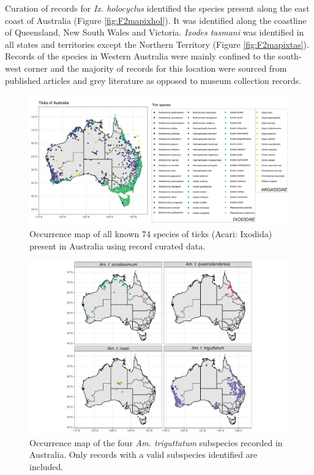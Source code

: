 \documentclass[a4paper, nobind]{templates/ociamthesis}
\begin{document}
Curation of records for \emph{Ix. holocyclus} identified the species present along the east coast of Australia (Figure \ref{fig:F2mapixhol}).
It was identified along the coastline of Queensland, New South Wales and Victoria.
\emph{Ixodes tasmani} was identified in all states and territories except the Northern Territory (Figure \ref{fig:F2mapixtas}).
Records of the species in Western Australia were mainly confined to the south-west corner and the majority of records for this location were sourced from published articles and grey literature as opposed to museum collection records.

\newpage

\begin{landscape}

\begin{figure}
\includegraphics[width=0.95\linewidth]{figures/ms-figs/Ch2-mapallticks} \caption[Map of tick species present in Australia.]{Occurrence map of all known 74 species of ticks (Acari: Ixodida) present in Australia using record curated data.}\label{fig:F2mapall}
\end{figure}

\end{landscape}

\newpage

\begin{figure}
\includegraphics[width=0.95\linewidth]{figures/ms-figs/Ch2-amtrisubsp} \caption[Map of \textit{Am. triguttatum} subspecies.]{Occurrence map of the four \textit{Am. triguttatum} subspecies recorded in Australia. Only records with a valid subspecies identified are included.}\label{fig:F2atrigmapsubp}
\end{figure}
\end{document}
